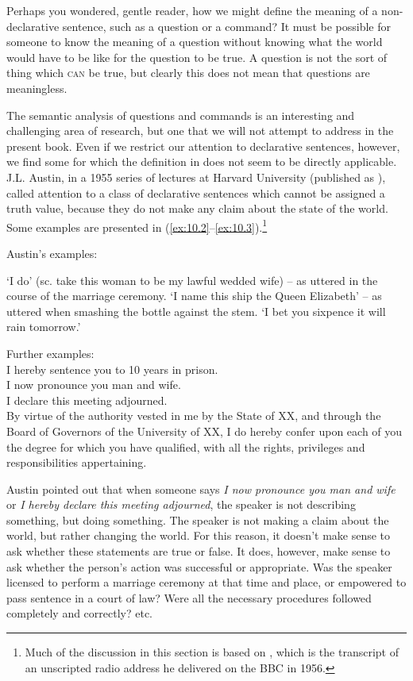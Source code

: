 Perhaps you wondered, gentle reader, how we might define the meaning of a non-declarative sentence, such as a question or a command? It must be possible for someone to know the meaning of a question without knowing what the world would have to be like for the question to be true. A question is not the sort of thing which \textsc{can} be true, but clearly this does not mean that questions are meaningless.



The semantic analysis of questions and commands is an interesting and challenging area of research, but one that we will not attempt to address in the present book. Even if we restrict our attention to declarative sentences, however, we find some for which the definition in  does not seem to be directly applicable. J.L. Austin, in a 1955 series of lectures at Harvard University (published as \citealt{Austin1962}), called attention to a class of declarative sentences which cannot be assigned a truth value, because they do not make any claim about the state of the world. Some examples are presented in (\ref{ex:10.2}--\ref{ex:10.3}).\footnote{Much of the discussion in this section is based on \citet{Austin1961}, which is the transcript of an unscripted radio address he delivered on the BBC in 1956.}


Austin’s examples:

\ea \label{ex:10.2}
\ea  ‘I do’ (sc. take this woman to be my lawful wedded wife) – as uttered in the course of the marriage ceremony.
\ex  ‘I name this ship the Queen Elizabeth’ – as uttered when smashing the bottle against the stem.
\ex   ‘I bet you sixpence it will rain tomorrow.’
\z \z

\ea \label{ex:10.3}
Further examples:\\
\ea I hereby sentence you to 10 years in prison.\\
\ex I now pronounce you man and wife.\\
\ex I declare this meeting adjourned.\\
\ex By virtue of the authority vested in me by the State of XX, and through the Board of Governors of the University of XX, I do hereby confer upon each of you the degree for which you have qualified, with all the rights, privileges and responsibilities appertaining.
\z
\z


Austin pointed out that when someone says \textit{I now pronounce you man and wife} or \textit{I hereby declare this meeting adjourned}, the speaker is not describing something, but doing something. The speaker is not making a claim about the world, but rather changing the world. For this reason, it doesn’t make sense to ask whether these statements are true or false. It does, however, make sense to ask whether the person’s action was successful or appropriate. Was the speaker licensed to perform a marriage ceremony at that time and place, or empowered to pass sentence in a court of law? Were all the necessary procedures followed completely and correctly? etc.



